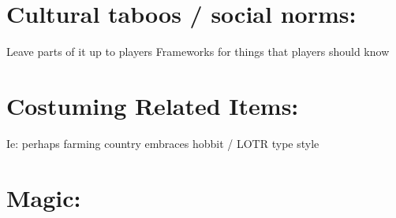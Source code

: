 \documentclass[blue]{GL2020}
\begin{document}
\section*{Cultural taboos / social norms:}

Leave parts of it up to players
Frameworks for things that players should know

\section*{Costuming Related Items:}

Ie: perhaps farming country embraces hobbit / LOTR type style

\section*{Magic:}
\end{document}
